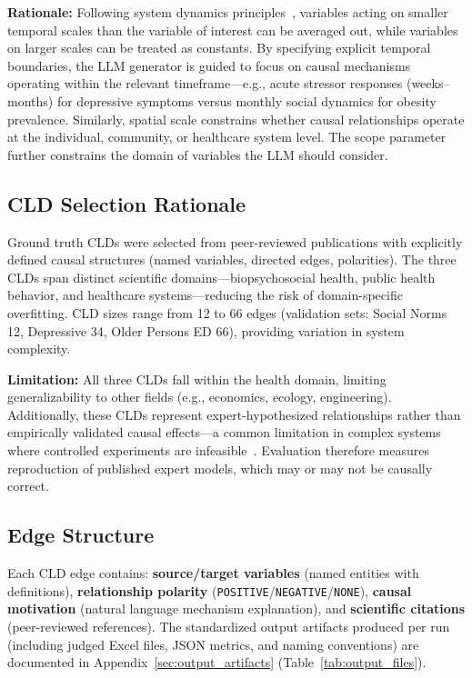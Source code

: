 \textbf{Rationale:} Following system dynamics principles~\cite{sterman2002system}, variables acting on smaller temporal scales than the variable of interest can be averaged out, while variables on larger scales can be treated as constants. By specifying explicit temporal boundaries, the LLM generator is guided to focus on causal mechanisms operating within the relevant timeframe---e.g., acute stressor responses (weeks--months) for depressive symptoms versus monthly social dynamics for obesity prevalence. Similarly, spatial scale constrains whether causal relationships operate at the individual, community, or healthcare system level. The scope parameter further constrains the domain of variables the LLM should consider.

\subsection{CLD Selection Rationale}
Ground truth CLDs were selected from peer-reviewed publications with explicitly defined causal structures (named variables, directed edges, polarities). The three CLDs span distinct scientific domains---biopsychosocial health, public health behavior, and healthcare systems---reducing the risk of domain-specific overfitting. CLD sizes range from 12 to 66 edges (validation sets: Social Norms 12, Depressive 34, Older Persons ED 66), providing variation in system complexity.

\textbf{Limitation:} All three CLDs fall within the health domain, limiting generalizability to other fields (e.g., economics, ecology, engineering). Additionally, these CLDs represent expert-hypothesized relationships rather than empirically validated causal effects---a common limitation in complex systems where controlled experiments are infeasible~\cite{uleman2024triangulation,crielaard2020socialnorms,smeekes2023emergency}. Evaluation therefore measures reproduction of published expert models, which may or may not be causally correct.

\subsection{Edge Structure}
Each CLD edge contains: \textbf{source/target variables} (named entities with definitions), \textbf{relationship polarity} (\texttt{POSITIVE}/\texttt{NEGATIVE}/\texttt{NONE}), \textbf{causal motivation} (natural language mechanism explanation), and \textbf{scientific citations} (peer-reviewed references).
The standardized output artifacts produced per run (including judged Excel files, JSON metrics, and naming conventions) are documented in Appendix~\ref{sec:output_artifacts} (Table~\ref{tab:output_files}).

